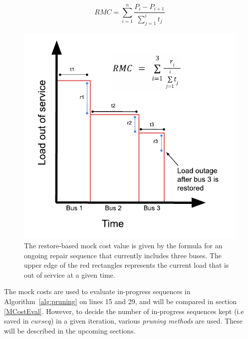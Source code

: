 \documentclass[12pt]{article}
\begin{document}
\begin{equation} 
   RMC=\sum_{i=1}^{n}\frac{P_i-P_{i+1}}{\sum_{j=1}^{i}t_j}
    \label{eq:rbmockcost}
\end{equation}
\begin{figure}[ht]
    \centering %
    \includegraphics[scale = 0.8]{RMCFigure.pdf}
    \caption[Restore based mock cost formula visualized]{The restore-based mock cost value is given by the formula for an ongoing repair sequence that currently includes three buses. The upper edge of the red rectangles represents the current load that is out of service at a given time.}
    \label{fig:RMCFigure}
\end{figure}

The mock costs are used to evaluate in-progress sequences in Algorithm~\ref{alg:pruning} on lines 15 and 29, and will be compared in section \ref{MCostEval}. However, to decide the number of in-progress sequences kept (i.e saved in $curseq$) in a given iteration, various \textit{pruning methods} are used. These will be described in the upcoming sections.
\end{document}
